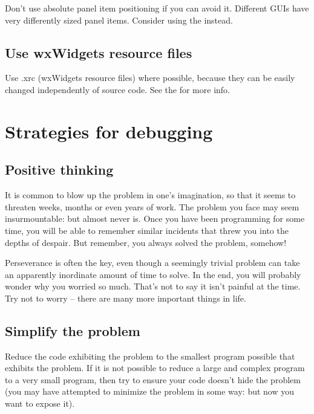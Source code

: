 Don't use absolute panel item positioning if you can avoid it. Different GUIs have
very differently sized panel items. Consider using the  instead.

\subsection{Use wxWidgets resource files}\label{useresources}

Use .xrc (wxWidgets resource files) where possible, because they can be easily changed
independently of source code. See the  for more info.

\section{Strategies for debugging}\label{debugstrategies}

\subsection{Positive thinking}\label{positivethinking}

It is common to blow up the problem in one's imagination, so that it seems to threaten
weeks, months or even years of work. The problem you face may seem insurmountable:
but almost never is. Once you have been programming for some time, you will be able
to remember similar incidents that threw you into the depths of despair. But
remember, you always solved the problem, somehow!

Perseverance is often the key, even though a seemingly trivial problem
can take an apparently inordinate amount of time to solve. In the end,
you will probably wonder why you worried so much. That's not to say it
isn't painful at the time. Try not to worry -- there are many more important
things in life.

\subsection{Simplify the problem}\label{simplifyproblem}

Reduce the code exhibiting the problem to the smallest program possible
that exhibits the problem. If it is not possible to reduce a large and
complex program to a very small program, then try to ensure your code
doesn't hide the problem (you may have attempted to minimize the problem
in some way: but now you want to expose it).

